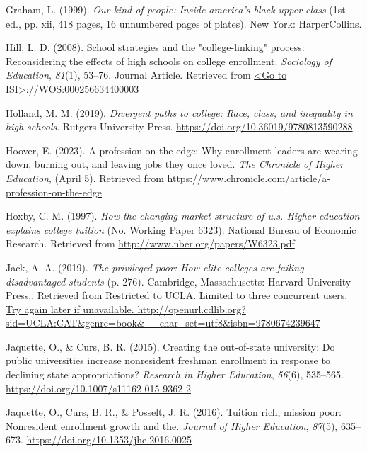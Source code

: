 \documentclass[
  12pt,
]{article}
\newlength{\cslhangindent}
\newenvironment{CSLReferences}[2] %
 {\begin{list}{}{%
  \setlength{\itemindent}{0pt}
  \setlength{\leftmargin}{0pt}
  \setlength{\parsep}{0pt}
  \ifodd #1
   \setlength{\leftmargin}{\cslhangindent}
   \setlength{\itemindent}{-1\cslhangindent}
  \fi
  \setlength{\itemsep}{#2\baselineskip}}}
 {\end{list}}
\begin{document}
\begin{CSLReferences}{1}{0}
Graham, L. (1999). \emph{Our kind of people: Inside america's black upper class} (1st ed., pp. xii, 418 pages, 16 unnumbered pages of plates). New York: HarperCollins.

Hill, L. D. (2008). School strategies and the "college-linking" process: Reconsidering the effects of high schools on college enrollment. \emph{Sociology of Education}, \emph{81}(1), 53--76. Journal Article. Retrieved from \href{\%3CGo\%20to\%20ISI\%3E://WOS:000256634400003}{\textless Go to ISI\textgreater://WOS:000256634400003}

Holland, M. M. (2019). \emph{Divergent paths to college: Race, class, and inequality in high schools}. Rutgers University Press. \url{https://doi.org/10.36019/9780813590288}

Hoover, E. (2023). A profession on the edge: Why enrollment leaders are wearing down, burning out, and leaving jobs they once loved. \emph{The Chronicle of Higher Education}, (April 5). Retrieved from \url{https://www.chronicle.com/article/a-profession-on-the-edge}

Hoxby, C. M. (1997). \emph{How the changing market structure of u.s. Higher education explains college tuition} (No. Working Paper 6323). National Bureau of Economic Research. Retrieved from \url{http://www.nber.org/papers/W6323.pdf}

Jack, A. A. (2019). \emph{The privileged poor: How elite colleges are failing disadvantaged students} (p. 276). Cambridge, Massachusetts: Harvard University Press,. Retrieved from \href{Restricted\%20to\%20UCLA.\%20Limited\%20to\%20three\%20concurrent\%20users.\%20Try\%20again\%20later\%20if\%20unavailable.\%20http://openurl.cdlib.org?sid=UCLA:CAT&genre=book&__char_set=utf8&isbn=9780674239647}{Restricted to UCLA. Limited to three concurrent users. Try again later if unavailable. http://openurl.cdlib.org?sid=UCLA:CAT\&genre=book\&\_\_char\_set=utf8\&isbn=9780674239647}

Jaquette, O., \& Curs, B. R. (2015). Creating the out-of-state university: Do public universities increase nonresident freshman enrollment in response to declining state appropriations? \emph{Research in Higher Education}, \emph{56}(6), 535--565. \url{https://doi.org/10.1007/s11162-015-9362-2}

Jaquette, O., Curs, B. R., \& Posselt, J. R. (2016). Tuition rich, mission poor: Nonresident enrollment growth and the. \emph{Journal of Higher Education}, \emph{87}(5), 635--673. \url{https://doi.org/10.1353/jhe.2016.0025}


\end{CSLReferences}
\end{document}
